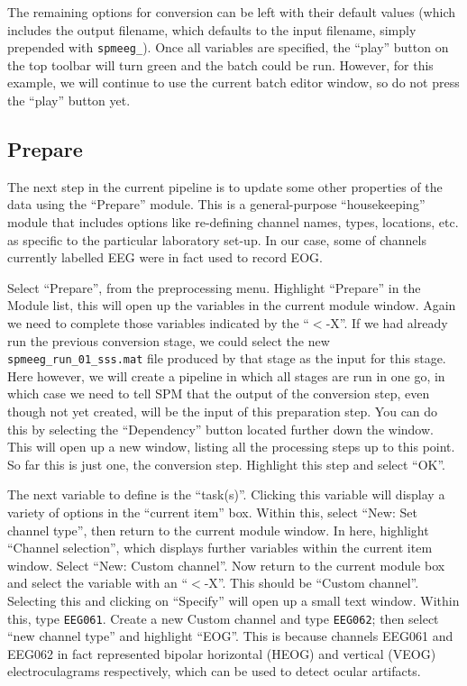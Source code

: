 The remaining options for conversion can be left with their default values (which includes the output filename, which defaults to the input filename, simply prepended with \texttt{spmeeg\_}). Once all variables are specified, the ``play'' button on the top toolbar will turn green and the batch could be run. However, for this example, we will continue to use the current batch editor window, so do not press the ``play'' button yet.

\subsection{Prepare}

The next step in the current pipeline is to update some other properties of the data using the ``Prepare'' module. This is a general-purpose ``housekeeping'' module that includes options like re-defining channel names, types, locations, etc. as specific to the particular laboratory set-up. In our case, some of channels currently labelled EEG were in fact used to record EOG.

Select ``Prepare'', from the preprocessing menu. Highlight ``Prepare'' in the Module list, this will open up the variables in the current module window. Again we need to complete those variables indicated by the ``\(<\)-X''. If we had already run the previous conversion stage, we could select the new \texttt{spmeeg\_run\_01\_sss.mat} file produced by that stage as the input for this stage. Here however, we will create a pipeline in which all stages are run in one go, in which case we need to tell SPM that the output of the conversion step, even though not yet created, will be the input of this preparation step. You can do this by selecting the ``Dependency'' button located further down the window. This will open up a new window, listing all the processing steps up to this point. So far this is just one, the conversion step. Highlight this step and select ``OK''.

The next variable to define is the ``task(s)''. Clicking this variable will display a variety of options in the ``current item'' box. Within this, select ``New: Set channel type'', then return to the current module window. In here, highlight ``Channel selection'', which displays further variables within the current item window. Select ``New: Custom channel''. Now return to the current module box and select the variable with an ``\(<\)-X''. This should be ``Custom channel''. Selecting this and clicking on ``Specify'' will open up a small text window. Within this, type \texttt{EEG061}. Create a new Custom channel and type \texttt{EEG062}; then select ``new channel type'' and highlight ``EOG''. This is because channels EEG061 and EEG062 in fact represented bipolar horizontal (HEOG) and vertical (VEOG) electroculagrams respectively, which can be used to detect ocular artifacts.

